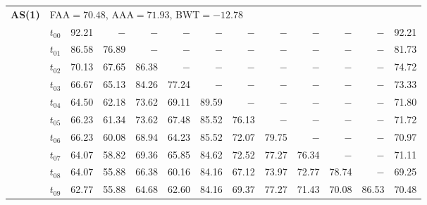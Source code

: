 \begin{table}[ht]
\begin{tabular}{@{}l l r r r r r r r r r r r@{}}
\midrule
\multirow{11}{*}{\textbf{AS(1)}} & \multicolumn{12}{l}{\quad\small FAA$=70.48$,\; AAA$=71.93$,\; BWT$=-12.78$} \\
 & $t_{00}$ & 92.21 & $-$ & $-$ & $-$ & $-$ & $-$ & $-$ & $-$ & $-$ & $-$ & 92.21 \\
 & $t_{01}$ & 86.58 & 76.89 & $-$ & $-$ & $-$ & $-$ & $-$ & $-$ & $-$ & $-$ & 81.73 \\
 & $t_{02}$ & 70.13 & 67.65 & 86.38 & $-$ & $-$ & $-$ & $-$ & $-$ & $-$ & $-$ & 74.72 \\
 & $t_{03}$ & 66.67 & 65.13 & 84.26 & 77.24 & $-$ & $-$ & $-$ & $-$ & $-$ & $-$ & 73.33 \\
 & $t_{04}$ & 64.50 & 62.18 & 73.62 & 69.11 & 89.59 & $-$ & $-$ & $-$ & $-$ & $-$ & 71.80 \\
 & $t_{05}$ & 66.23 & 61.34 & 73.62 & 67.48 & 85.52 & 76.13 & $-$ & $-$ & $-$ & $-$ & 71.72 \\
 & $t_{06}$ & 66.23 & 60.08 & 68.94 & 64.23 & 85.52 & 72.07 & 79.75 & $-$ & $-$ & $-$ & 70.97 \\
 & $t_{07}$ & 64.07 & 58.82 & 69.36 & 65.85 & 84.62 & 72.52 & 77.27 & 76.34 & $-$ & $-$ & 71.11 \\
 & $t_{08}$ & 64.07 & 55.88 & 66.38 & 60.16 & 84.16 & 67.12 & 73.97 & 72.77 & 78.74 & $-$ & 69.25 \\
 & $t_{09}$ & 62.77 & 55.88 & 64.68 & 62.60 & 84.16 & 69.37 & 77.27 & 71.43 & 70.08 & 86.53 & 70.48 \\
\bottomrule
\end{tabular}
\end{table}
